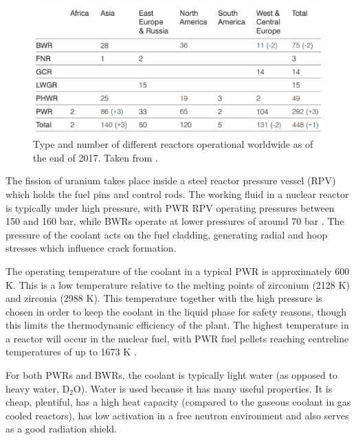 \begin{figure}[htp] %
\centering
\includegraphics[width=15cm]{images/WNA_report2018.png}
\caption[Type and number of different reactors operational worldwide as of the end of 2017.]{Type and number of different reactors operational worldwide as of the end of 2017. Taken from \cite{WNAreport2018}.}
\label{figure:world_reactors}
\end{figure}

The fission of uranium takes place inside a steel reactor pressure vessel (RPV) which holds the fuel pins and control rods. The working fluid in a nuclear reactor is typically under high pressure, with PWR RPV operating pressures between 150 and 160 bar, while BWRs operate at lower pressures of around 70 bar \cite{kok2016nuclear, Server2010, Durmayaz2001}. The pressure of the coolant acts on the fuel cladding, generating radial and hoop stresses which influence crack formation. 

The operating temperature of the coolant in a typical PWR is approximately 600 K. This is a low temperature relative to the melting points of zirconium (2128 K) and zirconia (2988 K). This temperature together with the high pressure is chosen in order to keep the coolant in the liquid phase for safety reasons, though this limits the thermodynamic efficiency of the plant. The highest temperature in a reactor will occur in the nuclear fuel, with PWR fuel pellets reaching centreline temperatures of up to 1673 K \cite{beyer1998review}.

For both PWRs and BWRs, the coolant is typically light water (as opposed to heavy water, D$_{2}$O). Water is used because it has many useful properties. It is cheap, plentiful, has a high heat capacity (compared to the gaseous coolant in gas cooled reactors), has low activation in a free neutron environment and also serves as a good radiation shield. 

